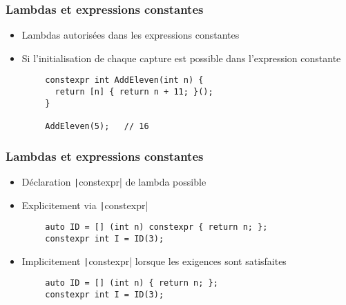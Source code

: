 \documentclass[C++.tex]{subfiles}
\begin{document}
\begin{frame}[fragile]
	\frametitle{Lambdas et expressions constantes}
	\begin{itemize}
		\item Lambdas autorisées dans les expressions constantes
		\item Si l'initialisation de chaque capture est possible dans l'expression constante
	\end{itemize}

	\begin{verbatim}
		constexpr int AddEleven(int n) {
		  return [n] { return n + 11; }();
		}

		AddEleven(5);   // 16
	\end{verbatim}

\end{frame}

\begin{frame}[fragile]
	\frametitle{Lambdas et expressions constantes}
	\begin{itemize}
		\item Déclaration \texttt|constexpr| de lambda possible
		\item Explicitement via \texttt|constexpr|
	\end{itemize}

	\begin{verbatim}
		auto ID = [] (int n) constexpr { return n; };
		constexpr int I = ID(3);
	\end{verbatim}

	\begin{itemize}
		\item Implicitement \texttt|constexpr| lorsque les exigences sont satisfaites
	\end{itemize}

	\begin{verbatim}
		auto ID = [] (int n) { return n; };
		constexpr int I = ID(3);
	\end{verbatim}

\end{frame}
\end{document}
